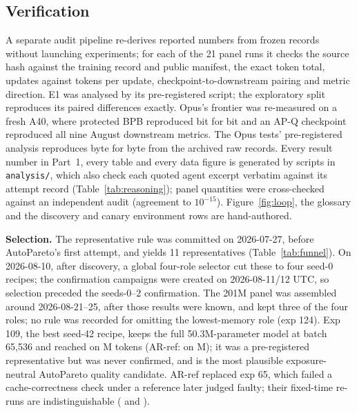 \documentclass{article}
\newif\ifshowhumanmarkers \showhumanmarkersfalse
\newcommand{\humantag}[1]{{\color{humanframe}\sffamily\scriptsize\bfseries HUMAN AUTHOR MUST REWRITE/VERIFY [#1]}\ }
\newcommand{\humanauthor}[2][]{\ifshowhumanmarkers\begin{humanbox}\humantag{#1}#2\end{humanbox}\else #2\par\fi}
\newcommand{\humancaption}[1]{\ifshowhumanmarkers\humantag{#1}\fi}
\begin{document}
\subsection{Verification}\label{sec:verification}
\humanauthor[P2-07]{A separate audit pipeline re-derives reported numbers from frozen records without launching experiments; for each of the 21 panel runs it checks the source hash against the training record and public manifest, the exact token total, updates against tokens per update, checkpoint-to-downstream pairing and metric direction. E1 was analysed by its pre-registered script; the exploratory split reproduces its paired differences exactly. Opus's frontier was re-measured on a fresh A40, where protected BPB reproduced bit for bit and an AP-Q checkpoint reproduced all nine August downstream metrics. The Opus tests' pre-registered analysis reproduces byte for byte from the archived raw records. Every result number in Part~1, every table and every data figure is generated by scripts in \texttt{analysis/}, which also check each quoted agent excerpt verbatim against its attempt record (Table~\ref{tab:reasoning}); \CRNCrossChecked{} panel quantities were cross-checked against an independent audit (agreement to $10^{-15}$). Figure~\ref{fig:loop}, the glossary and the discovery and canary environment rows are hand-authored.}

\begin{table}[t]
\caption{\humancaption{P2-08}Selection funnel from discovery attempts to the 201M-token panel (dates 2026). The per-campaign rule was committed before the first AutoPareto attempt; the global selector was applied after discovery, and the panel subset after the seeds-0--2 confirmation results were known.}\label{tab:funnel}
\centering\scriptsize\setlength{\tabcolsep}{3pt}
\end{table}

\humanauthor[P2-09]{\textbf{Selection.} The representative rule was committed on 2026-07-27, before AutoPareto's first attempt, and yields 11 representatives (Table~\ref{tab:funnel}). On 2026-08-10, after discovery, a global four-role selector cut these to four seed-0 recipes; the confirmation campaigns were created on 2026-08-11/12 UTC, so selection preceded the seeds-0--2 confirmation. The 201M panel was assembled around 2026-08-21--25, after those results were known, and kept three of the four roles; no rule was recorded for omitting the lowest-memory role (exp 124). Exp 109, the best seed-42 recipe, keeps the full 50.3M-parameter model at batch 65,536 and reached \CRExpOneZeroNineBPB{} on \CRExpOneZeroNineTokens M tokens (AR-ref: \CRSeedFortyTwoAR{} on \CRExpSixEightTokens M); it was a pre-registered representative but was never confirmed, and is the most plausible exposure-neutral AutoPareto quality candidate. AR-ref replaced exp 65, which failed a cache-correctness check under a reference later judged faulty; their fixed-time re-runs are indistinguishable (\CRFixedSixtyFive{} and \CRFixedSixtyEight).}
\end{document}

